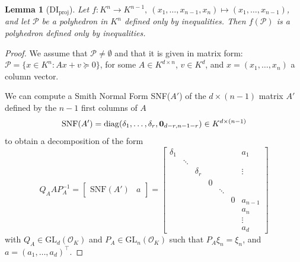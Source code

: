 \documentclass[sigconf]{acmart}
\newcommand{\PP}{\mathcal{P}}
\newtheorem{lemma}[theorem]{Lemma}
\newcommand{\OK}{\mathcal{O}_K}
\def\diag{\mathrm{diag}}
\newcommand{\GL}{\mathrm{GL}}
\begin{document}
\begin{lemma}[DI${}_{\mathrm{proj}}$]
  Let $f : K^n \to K^{n-1}, \: (x_1,\dots,x_{n-1},x_n) \mapsto (x_1,\dots,x_{n-1})$, and let
  $\PP$ be a polyhedron in $K^n$ defined only by inequalities. 
  Then $f(\PP)$ is a polyhedron defined only by inequalities. \label{lem:DIproj}
\end{lemma}
\begin{proof}
  We assume that $\PP \neq \emptyset$ and that it is given in
  matrix form: $\PP = \{x \in K^n : Ax+v \succeq 0\}$, for some 
  $A \in K^{d \times n}$, $v \in K^d$,
  and $x=(x_1,\dots,x_n)$ a column vector. 
  
  We can compute a Smith Normal Form SNF($A'$)
  of the $d \times (n-1)$ matrix $A'$ defined by the 
  $n-1$ first columns of $A$
  \[
\mathrm{SNF}(A') = \diag(\delta_1,\ldots,\delta_r,{\bf 0}_{d-r,n-1-r}) \in K^{d \times (n-1)}
\]
to obtain a decomposition of the form
\[
Q_A A P_A^{-1} =
\begin{bmatrix}
 \mathrm{SNF}(A') & a
\end{bmatrix}
=
\left[
\begin{smallmatrix}
\delta_1 &        &          &   &        &   & a_1     \\[-.25cm]
         & \ddots &          &   &        &   &         \\[-.35cm]
         &	  & \delta_r &   &        &   &  \vdots \\
         &	  &          & 0 &        &   &         \\[-.25cm]
         &	  &          &   & \ddots &   &         \\
         &	  &          &   &	  & 0 & a_{n-1} \\ 
         &	  &          &   &	  &   & a_n 	\\
         &	  &          &   &	  &   & \vdots 	\\
         &	  &          &   &	  &   & a_d 	
\end{smallmatrix}
\right]
\]
with $Q_A \in \GL_d(\OK)$ and $P_A \in \GL_n(\OK)$ such that $P_A \xi_n = \xi_n$,
and $a = (a_1,\ldots,a_d)^\intercal$.


\end{proof}
\end{document}
